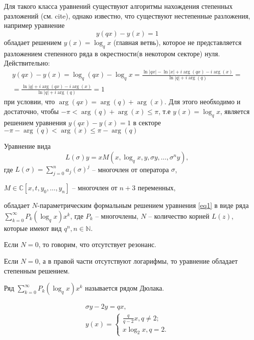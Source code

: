 \documentclass[a4paper, 14pt]{extarticle}
\begin{document}
Для такого класса уравнений существуют алгоритмы нахождения степенных разложений (см. cite), однако известно, что существуют нестепенные разложения, например уравнение
$$y(qx) - y(x) = 1$$
обладает решением $y(x) = \log_q x$ (главная ветвь), которое не представляется разложением степенного ряда в окрестности(в некотором секторе) нуля.
Действительно:
\begin{multline*}
    y(qx) - y(x) = \log_q (qx) - \log_q x = \frac{\ln |qx| - \ln|x| + i\arg (qx) - i\arg (x)}{\ln|q| + i\arg(q)} =\\
    = \frac{\ln|q| + i\arg (qx) - i\arg (x)}{\ln|q| + i\arg(q)} = 1
\end{multline*}
при условии, что $\arg (qx) = \arg(q) + \arg(x)$.
Для этого необходимо и достаточно, чтобы $-\pi < \arg(q) + \arg(x) \leqslant \pi$, т.е
$y(x) = \log_q x$, является решением уравнения $y(qx) - y(x) = 1$ в секторе $-\pi - \arg(q) < \arg(x) \leqslant \pi - \arg(q)$



\begin{theorem}
    Уравнение вида
    \begin{equation} L(\sigma)y = x M(x, \log_q x, y, \sigma y, \ldots, \sigma^n y),\label{eq1}\end{equation}
    где $L(\sigma) = \sum_{j = 0}^n a_j(\sigma)^j $ -- многочлен от оператора $\sigma$,
    
    $M\in \mathbb{C}[x, t, y_0, \ldots, y_n]$ -- многочлен от $n+3$ переменных,
    
    обладает $N$-параметрическим формальным решением уравнения \eqref{eq1} в виде ряда $\sum_{k=0}^\infty P_k(\log_q x)x^k$, где $P_k$ -- многочлены, 
    $N$ -- количество корней  $L(z)$, которые имеют вид  $q^n, n \in \mathbb{N}$.
\end{theorem}

\begin{remark}
    Если $N=0$, то говорим, что отсутствует резонанс.
\end{remark}

\begin{remark}
    Если $N=0$, а в правой части отсутствуют логарифмы, то уравнение обладает степенным решением.
\end{remark}
\begin{remark}
    Ряд $\sum_{k=0}^\infty P_k(\log_q x)x^k$ называется рядом Дюлака.
\end{remark}

\begin{example}
    \begin{gather*}
    \sigma y - 2 y = q x,\\
    y(x) =
    \begin{cases}
        \frac{q}{q-2} x, q\neq 2;\\
        x \log_2 x, q = 2.
    \end{cases}\\
    \end{gather*}
\end{example}
\end{document}
